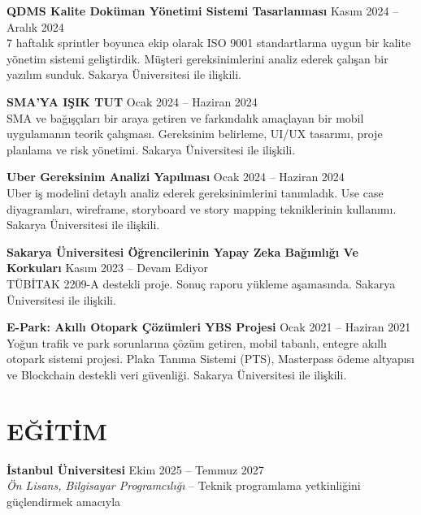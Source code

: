 \documentclass[a4paper,8pt]{article}
\begin{document}
\textbf{QDMS Kalite Doküman Yönetimi Sistemi Tasarlanması} \hfill {\small Kasım 2024 -- Aralık 2024}\\
{\small 7 haftalık sprintler boyunca ekip olarak ISO 9001 standartlarına uygun bir kalite yönetim sistemi geliştirdik. Müşteri gereksinimlerini analiz ederek çalışan bir yazılım sunduk. Sakarya Üniversitesi ile ilişkili.}

\vspace{3pt}

\textbf{SMA'YA IŞIK TUT} \hfill {\small Ocak 2024 -- Haziran 2024}\\
{\small SMA ve bağışçıları bir araya getiren ve farkındalık amaçlayan bir mobil uygulamanın teorik çalışması. Gereksinim belirleme, UI/UX tasarımı, proje planlama ve risk yönetimi. Sakarya Üniversitesi ile ilişkili.}

\vspace{3pt}

\textbf{Uber Gereksinim Analizi Yapılması} \hfill {\small Ocak 2024 -- Haziran 2024}\\
{\small Uber iş modelini detaylı analiz ederek gereksinimlerini tanımladık. Use case diyagramları, wireframe, storyboard ve story mapping tekniklerinin kullanımı. Sakarya Üniversitesi ile ilişkili.}

\vspace{3pt}

\textbf{Sakarya Üniversitesi Öğrencilerinin Yapay Zeka Bağımlığı Ve Korkuları} \hfill {\small Kasım 2023 -- Devam Ediyor}\\
{\small TÜBİTAK 2209-A destekli proje. Sonuç raporu yükleme aşamasında. Sakarya Üniversitesi ile ilişkili.}

\vspace{3pt}

\textbf{E-Park: Akıllı Otopark Çözümleri YBS Projesi} \hfill {\small Ocak 2021 -- Haziran 2021}\\
{\small Yoğun trafik ve park sorunlarına çözüm getiren, mobil tabanlı, entegre akıllı otopark sistemi projesi. Plaka Tanıma Sistemi (PTS), Masterpass ödeme altyapısı ve Blockchain destekli veri güvenliği. Sakarya Üniversitesi ile ilişkili.}

\section{EĞİTİM}

\textbf{İstanbul Üniversitesi} \hfill {\small Ekim 2025 -- Temmuz 2027}\\
{\small \textit{Ön Lisans, Bilgisayar Programcılığı} -- Teknik programlama yetkinliğini güçlendirmek amacıyla}
\end{document}
